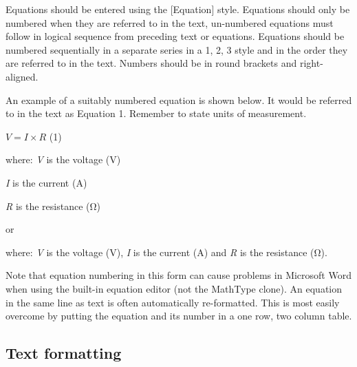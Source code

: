 \documentclass[12pt]{article}
\begin{document}
Equations should be entered using the {[}Equation{]} style. Equations
should only be numbered when they are referred to in the text,
un-numbered equations must follow in logical sequence from preceding
text or equations. Equations should be numbered sequentially in a
separate series in a 1, 2, 3 style and in the order they are referred to
in the text. Numbers should be in round brackets and right-aligned.

An example of a suitably numbered equation is shown below. It would be
referred to in the text as Equation 1. Remember to state units of
measurement.

\(V = I \times R\) (1)

where: \emph{V} is the voltage (V)

\emph{I} is the current (A)

\emph{R} is the resistance (Ω)

or

where: \emph{V} is the voltage (V), \emph{I} is the current (A) and
\emph{R} is the resistance (Ω).

Note that equation numbering in this form can cause problems in
Microsoft Word when using the built-in equation editor (not the MathType
clone). An equation in the same line as text is often automatically
re-formatted. This is most easily overcome by putting the equation and
its number in a one row, two column table.

\hypertarget{text-formatting}{%
\subsection{Text formatting}\label{text-formatting}}
\end{document}
